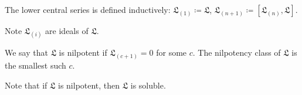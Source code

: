 The lower central series is defined inductively:
$\mathfrak{L}_{(1)}\coloneqq \mathfrak{L}$,
$\mathfrak{L}_{(n + 1)}\coloneqq [\mathfrak{L}_{(n)}, \mathfrak{L}]$.

Note $\mathfrak{L}_{(i)}$ are ideals of $\mathfrak{L}$.

We say that  $\mathfrak{L}$ is nilpotent if $\mathfrak{L}_{(c+1)} = 0$ for
some $c$. The nilpotency class of $\mathfrak{L}$ is the smallest such $c$.

Note that if $\mathfrak{L}$ is nilpotent, then $\mathfrak{L}$ is soluble.
